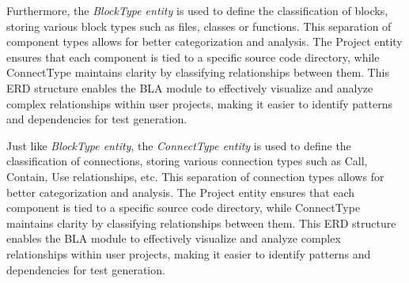 \hspace{0.5cm}Furthermore, the \textit{BlockType entity} is used to define the classification of blocks, storing various block types such as files, classes or functions. This separation of component types allows for better categorization and analysis. The Project entity ensures that each component is tied to a specific source code directory, while ConnectType maintains clarity by classifying relationships between them. This ERD structure enables the BLA module to effectively visualize and analyze complex relationships within user projects, making it easier to identify patterns and dependencies for test generation.

\hspace{0.5cm} Just like \textit{BlockType entity}, the \textit{ConnectType entity} is used to define the classification of connections, storing various connection types such as Call, Contain, Use relationships, etc. This separation of connection types allows for better categorization and analysis. The Project entity ensures that each component is tied to a specific source code directory, while ConnectType maintains clarity by classifying relationships between them. This ERD structure enables the BLA module to effectively visualize and analyze complex relationships within user projects, making it easier to identify patterns and dependencies for test generation.


